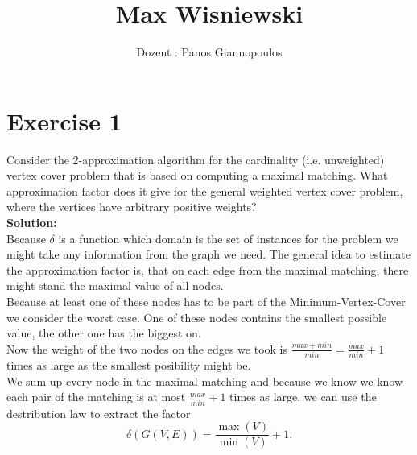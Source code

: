 \documentclass[11pt,a4paper,ngerman]{article}
\date{}
\title{Max Wisniewski}
\author{Dozent : Panos Giannopoulos}
\begin{document}

\renewcommand{\figurename}{Figure}


\maketitle
\thispagestyle{fancy}


\section*{Exercise 1}

Consider the 2-approximation algorithm for the cardinality (i.e. unweighted) vertex cover problem that is based on computing a maximal matching. What approximation factor does it give for the general weighted vertex cover problem, where the vertices have arbitrary positive weights?\\

\textbf{Solution:}\\
Because $\delta$ is a function which domain is the set of instances for the problem we might take any information from the graph we need. The general idea to estimate the approximation factor is, that on each edge from the maximal matching, there might stand the maximal value of all nodes.\\
Because at least one of these nodes has to be part of the Minimum-Vertex-Cover we consider the worst case. One of these nodes contains the smallest possible value, the other one has the biggest on.\\
Now the weight of the two nodes on the edges we took is $\frac{max+min}{min} = \frac{max}{min}+1$ times as large as the smallest posibility might be.\\
We sum up every node in the maximal matching and because we know we know each pair of the matching is at most $\frac{max}{min}+1$ times as large, we can use the destribution law to extract the factor 
$$
	\delta (G(V,E)) = \frac{\max (V)}{\min (V)} + 1.
$$
\end{document}
